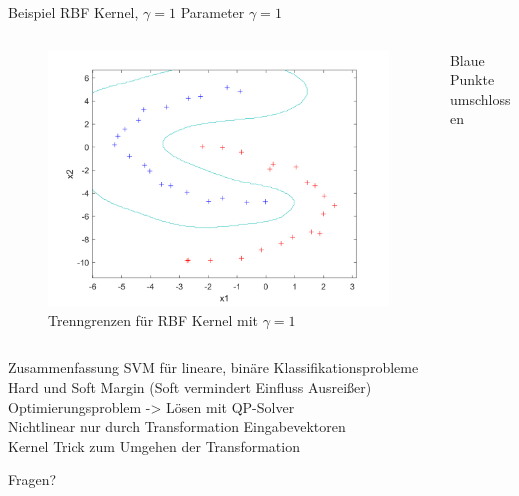 \documentclass[ngerman]{beamer}
\begin{document}
\begin{frame}{Beispiel RBF Kernel, $\gamma=1$}
    Parameter $\gamma=1$ \\ \pause
    \begin{columns}
        \begin{column}{0.8\textwidth}
        \begin{figure}
            \includegraphics[width=\textwidth,height=0.7\textheight,keepaspectratio]{../code/octave/images/sgdrbfkernel}
            \caption{Trenngrenzen für RBF Kernel mit $\gamma=1$}
            \label{fig:bsprbfkernel}
        \end{figure}
    \end{column} \pause
        \begin{column}{0.2\textwidth}
    Blaue Punkte umschlossen
            \end{column}
        \end{columns}
\end{frame}

\begin{frame}{Zusammenfassung}
    \centering
    SVM für lineare, binäre Klassifikationsprobleme \\ \pause
    Hard und Soft Margin (Soft vermindert Einfluss Ausreißer) \\ \pause
    Optimierungsproblem -> Lösen mit QP-Solver \\ \pause
    Nichtlinear nur durch Transformation Eingabevektoren \\ \pause
    Kernel Trick zum Umgehen der Transformation \\
\end{frame}

\begin{frame}[standout]
	Fragen?
\end{frame}
\end{document}
